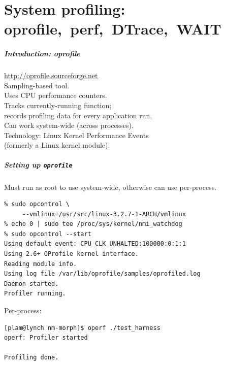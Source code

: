 

\part{System profiling: oprofile,~perf,~DTrace,~WAIT}
\frame{\partpage}

\begin{frame}
  \frametitle{Introduction: oprofile}


    \url{http://oprofile.sourceforge.net}\\[1em]

    Sampling-based tool.\\[1em]
    
    Uses CPU performance counters.\\[1em]

    Tracks currently-running function;\\
    records profiling data for every application run.\\[1em]

    Can work system-wide (across processes).\\[1em]

    Technology: Linux Kernel Performance Events\\ (formerly a Linux kernel module).

\end{frame}

\begin{frame}[fragile]
  \frametitle{Setting up {\tt oprofile}}


  Must run as root to use system-wide, otherwise can use per-process.

  \begin{lstlisting}
% sudo opcontrol \
     --vmlinux=/usr/src/linux-3.2.7-1-ARCH/vmlinux
% echo 0 | sudo tee /proc/sys/kernel/nmi_watchdog
% sudo opcontrol --start
Using default event: CPU_CLK_UNHALTED:100000:0:1:1
Using 2.6+ OProfile kernel interface.
Reading module info.
Using log file /var/lib/oprofile/samples/oprofiled.log
Daemon started.
Profiler running.
  \end{lstlisting}

  Per-process:
\begin{lstlisting}
[plam@lynch nm-morph]$ operf ./test_harness
operf: Profiler started

Profiling done.
\end{lstlisting}%


\end{frame}

